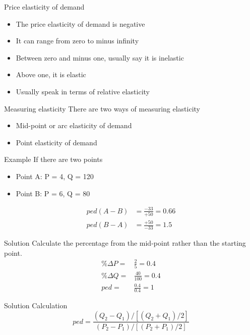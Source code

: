 \documentclass[14pt,xcolor=pdftex,dvipsnames,table]{beamer}\usepackage[]{graphicx}\usepackage[]{color}
\begin{document}
\begin{frame}{Price elasticity of demand}
\begin{itemize}[<+-| alert@+>]
\item The price elasticity of demand is negative
\item It can range from zero to minus infinity
\item Between zero and minus one, usually say it is inelastic
\item Above one, it is elastic
\item Usually speak in terms of relative elasticity
\end{itemize}
\end{frame}

\begin{frame}{Measuring elasticity}
There are two ways of measuring elasticity 
\begin{itemize}[<+-| alert@+>]
\item Mid-point or arc elasticity of demand
\item Point elasticity of demand
\end{itemize}
\end{frame}

\begin{frame}{Example}
If there are two points
\begin{itemize}[<+-| alert@+>]
\item Point A:  P = 4, Q = 120
\item Point B: P = 6, Q = 80
\end{itemize}
\pause
\begin{align*}
ped(A - B) &= \frac{-33}{+50} = 0.66\\
ped(B - A) & = \frac{+50}{-33} = 1.5
\end{align*}
\end{frame}

\begin{frame}{Solution}
Calculate the percentage from the mid-point rather than the starting point. 
\begin{align*}
\% \Delta P =& \frac{2}{5} = 0.4\\
\% \Delta Q =& \frac{40}{100} = 0.4\\
ped = &\frac{0.4}{0.4} = 1
\end{align*}
\end{frame}

\begin{frame}{Solution}
Calculation 
\begin{equation*}
ped = \frac{(Q_2 - Q_1)/[(Q_2 + Q_1)/2]}{(P_2 - P_1)/[(P_2 + P_1)/2]}
\end{equation*}
\end{frame}
\end{document}
